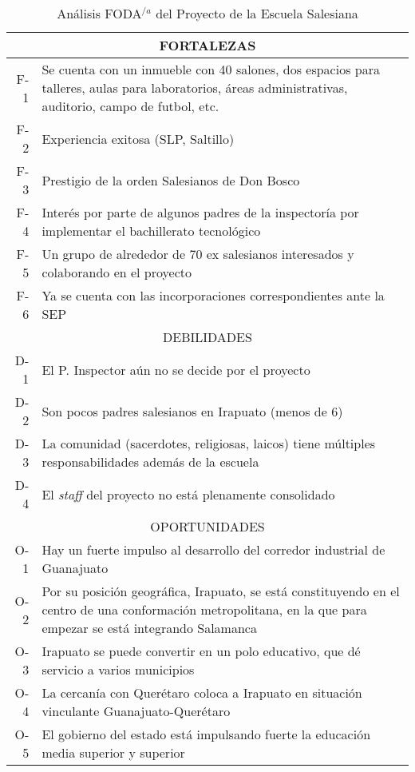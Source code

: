 \begin{table}[h!]
    \centering
    \caption[Análisis FODA del Proyecto de la Escuela Salesiana]{Análisis FODA$^{/a}$ del Proyecto de la Escuela Salesiana}
    \label{tbl:Foda}
    \footnotesize
    \begin{tabular}{r|p{5in}}
    	\multicolumn{2}{c}{FORTALEZAS} \\
    	\hline
    	\hline
    	F-1 & Se cuenta con un inmueble con 40 salones, dos espacios para talleres, aulas para laboratorios, áreas administrativas, auditorio, campo de futbol, etc. \\
    	F-2 & Experiencia exitosa (SLP, Saltillo) \\
    	F-3 & Prestigio de la orden Salesianos de Don Bosco \\
    	F-4 & Interés por parte de algunos padres de la inspectoría por implementar el bachillerato tecnológico \\
    	F-5 & Un grupo de alrededor de 70 ex salesianos interesados y colaborando en el proyecto \\
    	F-6 & Ya se cuenta con las incorporaciones correspondientes ante la SEP \\
    	\hline
    	\multicolumn{2}{c}{DEBILIDADES} \\
    	\hline
    	\hline
    	D-1 & El P. Inspector aún no se decide por el proyecto \\
    	D-2 & Son pocos padres salesianos en Irapuato (menos de 6) \\
    	D-3 & La comunidad (sacerdotes, religiosas, laicos) tiene múltiples responsabilidades además de la escuela \\
    	D-4 & El \emph{staff} del proyecto no est\'a plenamente consolidado \\
    	\hline
    	\multicolumn{2}{c}{OPORTUNIDADES} \\
    	\hline
    	\hline
    	O-1 & Hay un fuerte impulso al desarrollo del corredor industrial de Guanajuato \\
    	O-2 & Por su posición geográfica, Irapuato, se está constituyendo en el centro de una conformación metropolitana, en la que para empezar se está integrando Salamanca \\
    	O-3 & Irapuato se puede convertir en un polo educativo, que dé servicio a varios municipios \\
    	O-4 & La cercanía con Querétaro coloca a Irapuato en situación vinculante Guanajuato-Querétaro \\
    	O-5 & El gobierno del estado está impulsando fuerte la educación media superior y superior \\

\end{tabular}
\end{table}

